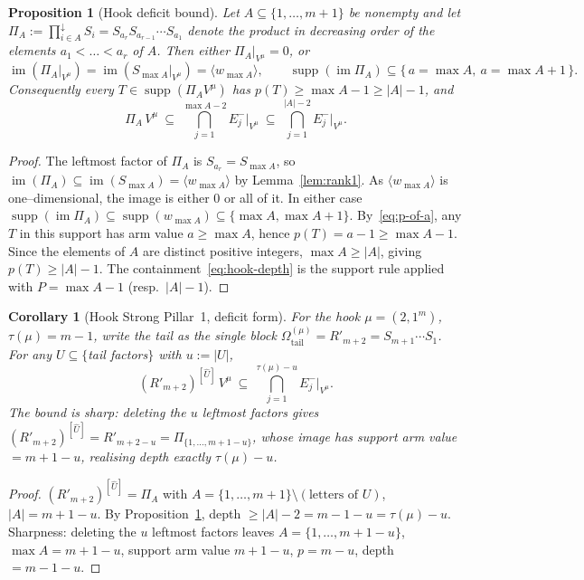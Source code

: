 \documentclass[11pt]{article}
\newtheorem{proposition}[theorem]{Proposition}
\newtheorem{corollary}[theorem]{Corollary}
\theoremstyle{definition}
\DeclareMathOperator{\im}{im}
\DeclareMathOperator{\supp}{supp}
\newcommand{\Vmu}{V^\mu}
\newcommand{\Rp}{{R'}}
\newcommand{\Em}[1]{E^{-}_{#1}}
\begin{document}
\begin{proposition}[Hook deficit bound]\label{prop:hook}
Let $A\subseteq\{1,\dots,m+1\}$ be nonempty and let
$\Pi_A:=\prod_{i\in A}^{\downarrow}S_i=S_{a_r}S_{a_{r-1}}\cdots S_{a_1}$ denote the product
in \emph{decreasing} order of the elements $a_1<\dots<a_r$ of $A$. Then either
$\Pi_A|_{\Vmu}=0$, or
\[
   \im(\Pi_A|_{\Vmu})=\im(S_{\max A}|_{\Vmu})=\langle w_{\max A}\rangle,
   \qquad \supp(\im\Pi_A)\subseteq\{\,a=\max A,\ a=\max A+1\,\}.
\]
Consequently every $T\in\supp(\Pi_A\Vmu)$ has $p(T)\ge\max A-1\ge|A|-1$, and
\begin{equation}\label{eq:hook-depth}
   \Pi_A\,\Vmu\ \subseteq\ \bigcap_{j=1}^{\max A-2}\Em j\big|_{\Vmu}
   \ \subseteq\ \bigcap_{j=1}^{|A|-2}\Em j\big|_{\Vmu}.
\end{equation}
\end{proposition}

\begin{proof}
The leftmost factor of $\Pi_A$ is $S_{a_r}=S_{\max A}$, so
$\im(\Pi_A)\subseteq\im(S_{\max A})=\langle w_{\max A}\rangle$ by
Lemma~\ref{lem:rank1}. As $\langle w_{\max A}\rangle$ is one--dimensional, the image is
either $0$ or all of it. In either case $\supp(\im\Pi_A)\subseteq\supp(w_{\max A})
\subseteq\{\max A,\max A+1\}$. By~\eqref{eq:p-of-a}, any $T$ in this support has arm value
$a\ge\max A$, hence $p(T)=a-1\ge\max A-1$. Since the elements of $A$ are distinct positive
integers, $\max A\ge|A|$, giving $p(T)\ge|A|-1$. The containment~\eqref{eq:hook-depth} is
the support rule applied with $P=\max A-1$ (resp.\ $|A|-1$).
\end{proof}

\begin{corollary}[Hook Strong Pillar~1, deficit form]\label{cor:hook-strong}
For the hook $\mu=(2,1^m)$, $\tau(\mu)=m-1$, write the tail as the single block
$\Omega^{(\mu)}_{\mathrm{tail}}=\Rp_{m+2}=S_{m+1}\cdots S_1$. For any
$U\subseteq\{$tail factors$\}$ with $u:=|U|$,
\[
   (\Rp_{m+2})^{[\widehat U]}\,\Vmu\ \subseteq\ \bigcap_{j=1}^{\tau(\mu)-u}\Em j\big|_{\Vmu}.
\]
The bound is sharp: deleting the $u$ leftmost factors gives
$(\Rp_{m+2})^{[\widehat U]}=\Rp_{m+2-u}=\Pi_{\{1,\dots,m+1-u\}}$, whose image has support
arm value $=m+1-u$, realising depth exactly $\tau(\mu)-u$.
\end{corollary}

\begin{proof}
$(\Rp_{m+2})^{[\widehat U]}=\Pi_A$ with $A=\{1,\dots,m+1\}\setminus(\text{letters of }U)$,
$|A|=m+1-u$. By Proposition~\ref{prop:hook}, depth $\ge|A|-2=m-1-u=\tau(\mu)-u$.
Sharpness: deleting the $u$ leftmost factors leaves $A=\{1,\dots,m+1-u\}$, $\max A=m+1-u$,
support arm value $m+1-u$, $p=m-u$, depth $=m-1-u$.
\end{proof}
\end{document}
